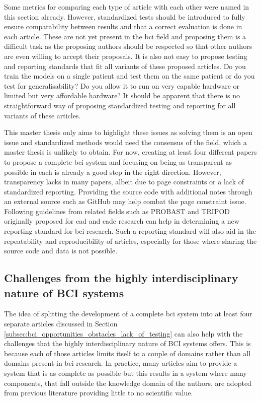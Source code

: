 Some metrics for comparing each type of article with each other were named in this section already.
However, standardized tests should be introduced to fully ensure comparability between results and that a correct evaluation is done in each article.
These are not yet present in the \gls{bci} field and proposing them is a difficult task as the proposing authors should be respected so that other authors are even willing to accept their proposals.
It is also not easy to propose testing and reporting standards that fit all variants of these proposed articles.
Do you train the models on a single patient and test them on the same patient or do you test for generalisability?
Do you allow it to run on very capable hardware or limited but very affordable hardware?
It should be apparent that there is no straightforward way of proposing standardized testing and reporting for all variants of these articles.

This master thesis only aims to highlight these issues as solving them is an open issue and standardized methods would need the consensus of the field, which a master thesis is unlikely to obtain.
For now, creating at least four different papers to propose a complete \gls{bci} system and focusing on being as transparent as possible in each is already a good step in the right direction.
However, transparency lacks in many papers, albeit due to page constraints or a lack of standardized reporting.
Providing the source code with additional notes through an external source such as GitHub may help combat the page constraint issue.
Following guidelines from related fields such as PROBAST  \citep{probast} and TRIPOD  \citep{tripod} originally proposed for \gls{cad} and \gls{cade} research can help in determining a new reporting standard for \gls{bci} research.
Such a reporting standard will also aid in the repeatability and reproducibility of articles, especially for those where sharing the source code and data is not possible.


\subsection{Challenges from the highly interdisciplinary nature of BCI systems}
\label{subsec:bci_opportunities_obstacles_interdisciplinary}

The idea of splitting the development of a complete \gls{bci} system into at least four separate articles discussed in Section \ref{subsec:bci_opportunities_obstacles_lack_of_testing} can also help with the challenges that the highly interdisciplinary nature of BCI systems offers.
This is because each of those articles limits itself to a couple of domains rather than all domains present in \gls{bci} research.
In practice, many articles aim to provide a system that is as complete as possible but this results in a system where many components, that fall outside the knowledge domain of the authors, are adopted from previous literature providing little to no scientific value.

